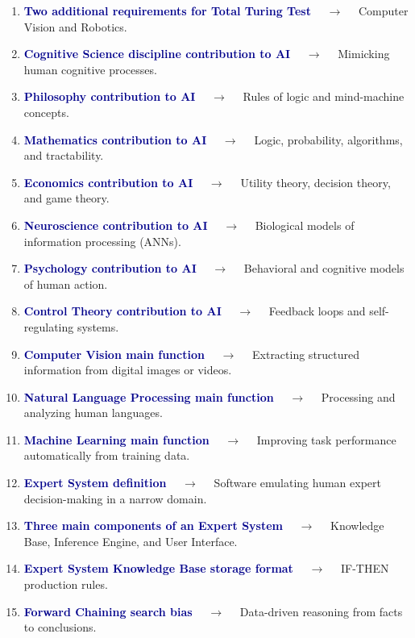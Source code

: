 \documentclass[11pt,a4paper]{article}
\begin{document}
\begin{enumerate}[label=\arabic*., leftmargin=*, labelsep=0.8em, itemsep=0.35em, parsep=0.1em, topsep=0.2em]
  \item \textcolor{darkblue}{\textbf{Two additional requirements for Total Turing Test}} $\quad\to\quad$ Computer Vision and Robotics.
  \item \textcolor{darkblue}{\textbf{Cognitive Science discipline contribution to AI}} $\quad\to\quad$ Mimicking human cognitive processes.
  \item \textcolor{darkblue}{\textbf{Philosophy contribution to AI}} $\quad\to\quad$ Rules of logic and mind-machine concepts.
  \item \textcolor{darkblue}{\textbf{Mathematics contribution to AI}} $\quad\to\quad$ Logic, probability, algorithms, and tractability.
  \item \textcolor{darkblue}{\textbf{Economics contribution to AI}} $\quad\to\quad$ Utility theory, decision theory, and game theory.
  \item \textcolor{darkblue}{\textbf{Neuroscience contribution to AI}} $\quad\to\quad$ Biological models of information processing (ANNs).
  \item \textcolor{darkblue}{\textbf{Psychology contribution to AI}} $\quad\to\quad$ Behavioral and cognitive models of human action.
  \item \textcolor{darkblue}{\textbf{Control Theory contribution to AI}} $\quad\to\quad$ Feedback loops and self-regulating systems.
  \item \textcolor{darkblue}{\textbf{Computer Vision main function}} $\quad\to\quad$ Extracting structured information from digital images or videos.
  \item \textcolor{darkblue}{\textbf{Natural Language Processing main function}} $\quad\to\quad$ Processing and analyzing human languages.
  \item \textcolor{darkblue}{\textbf{Machine Learning main function}} $\quad\to\quad$ Improving task performance automatically from training data.
  \item \textcolor{darkblue}{\textbf{Expert System definition}} $\quad\to\quad$ Software emulating human expert decision-making in a narrow domain.
  \item \textcolor{darkblue}{\textbf{Three main components of an Expert System}} $\quad\to\quad$ Knowledge Base, Inference Engine, and User Interface.
  \item \textcolor{darkblue}{\textbf{Expert System Knowledge Base storage format}} $\quad\to\quad$ IF-THEN production rules.
  \item \textcolor{darkblue}{\textbf{Forward Chaining search bias}} $\quad\to\quad$ Data-driven reasoning from facts to conclusions.

\end{enumerate}
\end{document}
